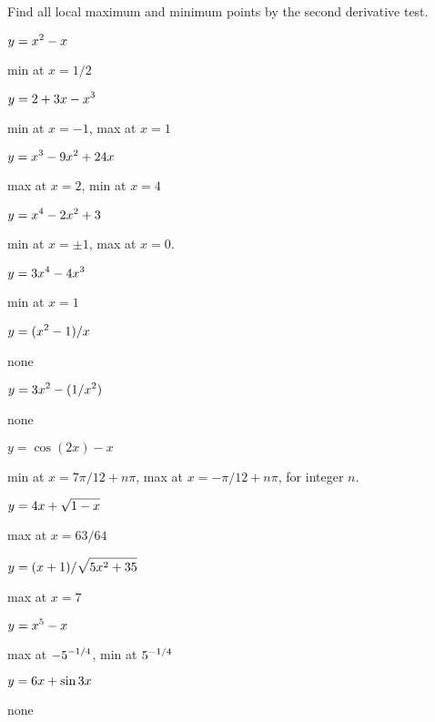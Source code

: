 \begin{exercises}
Find all local maximum and minimum points by the second derivative
test. 

\twocol
\exercise $\displaystyle y=x^2-x$ 
\begin{answer} min at $x=1/2$
\end{answer}

\exercise $\displaystyle y=2+3x-x^3$ 
\begin{answer} min at $x=-1$, max at $x=1$
\end{answer}

\exercise $\displaystyle y=x^3-9x^2+24x$
\begin{answer} max at $x=2$, min at $x=4$
\end{answer}

\exercise $\displaystyle y=x^4-2x^2+3$ 
\begin{answer} min at $x=\pm 1$, max at $x=0$.
\end{answer}

\exercise $\displaystyle y=3x^4-4x^3$
\begin{answer} min at $x=1$
\end{answer}

\exercise $\displaystyle y=(x^2-1)/x$
\begin{answer} none
\end{answer}

\exercise $\displaystyle y=3x^2-(1/x^2)$ 
\begin{answer} none
\end{answer}

\exercise $y=\cos(2x)-x$ 
\begin{answer} min at $x=7\pi/12+n\pi$, max at $x=-\pi/12+n\pi$, for integer $n$.
\end{answer}

\exercise $\displaystyle y = 4x+\sqrt{1-x}$
\begin{answer} max at $x=63/64$
\end{answer}

\exercise $\displaystyle y = (x+1)/\sqrt{5x^2 + 35}$
\begin{answer} max at $x=7$
\end{answer}

\exercise $\displaystyle y= x^5 - x$
\begin{answer} max at $\displaystyle -5^{-1/4}$, min at $\displaystyle 5^{-1/4}$
\end{answer}

\exercise $\displaystyle y = 6x +\sin 3x$
\begin{answer} none
\end{answer}


\end{exercises}
